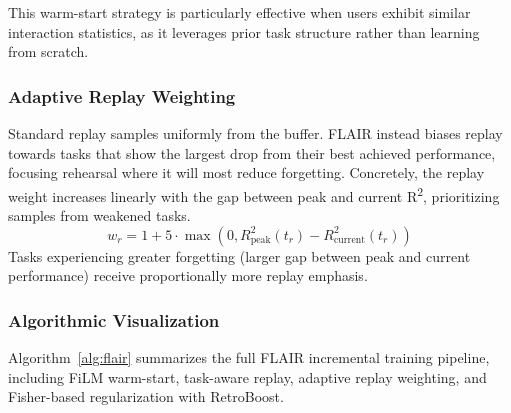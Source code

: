 \documentclass[3p,times,procedia]{elsarticle}
\begin{document}
This warm-start strategy is particularly effective when users exhibit similar interaction statistics, as it leverages prior task structure rather than learning from scratch.

\subsubsection{Adaptive Replay Weighting}
\label{sec:adaptive}

Standard replay samples uniformly from the buffer. FLAIR instead biases replay towards tasks that show the largest drop from their best achieved performance, focusing rehearsal where it will most reduce forgetting. Concretely, the replay weight increases linearly with the gap between peak and current R\textsuperscript{2}, prioritizing samples from weakened tasks.
\begin{equation}
    w_r = 1 + 5 \cdot \max\left(0, R^2_{\text{peak}}(t_r) - R^2_{\text{current}}(t_r)\right)
\end{equation}
Tasks experiencing greater forgetting (larger gap between peak and current performance) receive proportionally more replay emphasis.

\subsubsection{Algorithmic Visualization}

Algorithm~\ref{alg:flair} summarizes the full FLAIR incremental training pipeline, including FiLM warm-start, task-aware replay, adaptive replay weighting, and Fisher-based regularization with RetroBoost.
\end{document}
